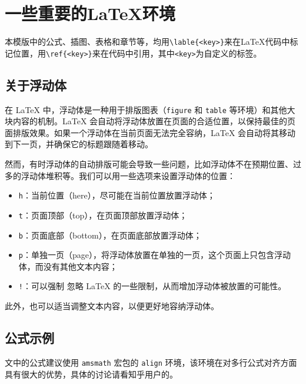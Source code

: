 \chapter{一些重要的\LaTeX{}环境}\label{chap:evm}

本模版中的公式、插图、表格和章节等，均用\texttt{\textbackslash lable\{<key>\}}来在\LaTeX{}代码中标记位置，用\texttt{\textbackslash ref\{<key>\}}来在代码中引用，其中\texttt{<key>}为自定义的标签。

\section{关于浮动体}
在 \LaTeX{} 中，浮动体是一种用于排版图表（\texttt{figure} 和 \texttt{table} 等环境）和其他大块内容的机制。\LaTeX{} 会自动将浮动体放置在页面的合适位置，以保持最佳的页面排版效果。如果一个浮动体在当前页面无法完全容纳，\LaTeX{} 会自动将其移动到下一页，并确保它的标题跟随着移动。

然而，有时浮动体的自动排版可能会导致一些问题，比如浮动体不在预期位置、过多的浮动体堆积等。我们可以用一些选项来设置浮动体的位置： 
\begin{itemize}
    \item \texttt{h}：当前位置（here），尽可能在当前位置放置浮动体；
    \item \texttt{t}：页面顶部（top），在页面顶部放置浮动体；
    \item \texttt{b}：页面底部（bottom），在页面底部放置浮动体；
    \item \texttt{p}：单独一页（page），将浮动体放置在单独的一页，这个页面上只包含浮动体，而没有其他文本内容；
    \item \texttt{!}：可以强制 忽略 \LaTeX{} 的一些限制，从而增加浮动体被放置的可能性。
\end{itemize}
此外，也可以适当调整文本内容，以便更好地容纳浮动体。

\section{公式示例}

文中的公式建议使用 \texttt{amsmath} 宏包的 \texttt{align} 环境，该环境在对多行公式对齐方面具有很大的优势，具体的讨论请看知乎用户\href{https://www.zhihu.com/people/bo-xue-duo-wen-63}{}的\href{https://www.zhihu.com/question/477805692/answer/2045084752}{}。

